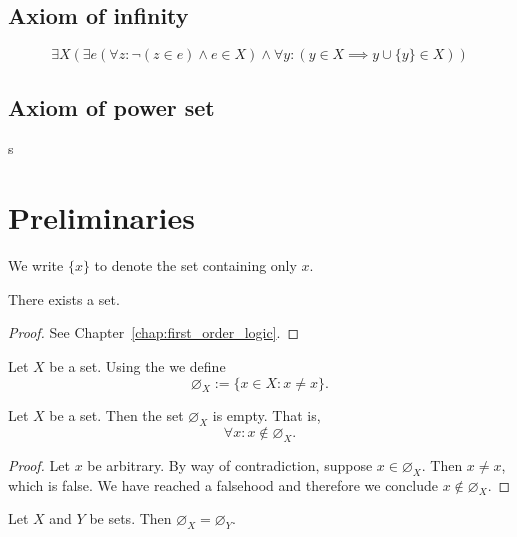 \documentclass[../../main.tex]{subfiles}
\begin{document}
\subsection{Axiom of infinity}\label{subsec:fundamentals:axiom_of_infinity}
\begin{equation*}
    \exists X(\exists e(\forall z:\lnot(z\in e)\land e\in X)\land\forall y:(y\in X\implies y\cup\{y\}\in X))
\end{equation*}
\subsection{Axiom of power set}\label{subsec:fundamentals:axiom_of_power_set}
s

\section{Preliminaries}
\begin{notation}[Set]
    We write $\{x\}$ to denote the set containing only $x$.
\end{notation}
\begin{theorem}
    There exists a set.
\end{theorem}
\begin{proof}
    See Chapter~\ref{chap:first_order_logic}.
\end{proof}
\begin{definition}
    Let $X$ be a set. Using the  we define
    \begin{equation*}
        \varnothing_X:=\{x\in X:x\neq x\}.
    \end{equation*}
\end{definition}
\begin{theorem}
    Let $X$ be a set. Then the set $\varnothing_X$ is empty. That is,
    \begin{equation*}
        \forall x:x\notin\varnothing_X.
    \end{equation*}
\end{theorem}
\begin{proof}
    Let $x$ be arbitrary. By way of contradiction, suppose $x\in\varnothing_X$. Then $x\neq x$, which is false. We have reached a falsehood and therefore we conclude $x\notin\varnothing_X$.
\end{proof}
\begin{corollary}
    Let $X$ and $Y$ be sets. Then $\varnothing_X=\varnothing_Y$.
\end{corollary}
\end{document}
